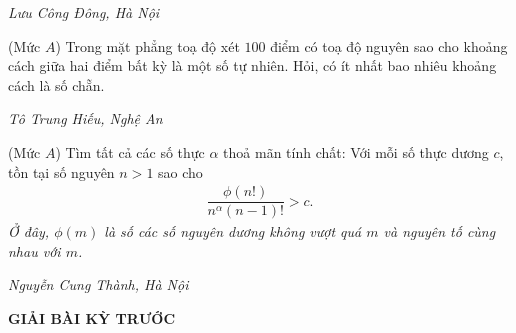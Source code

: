 \begin{multicols}{2}
\begin{flushright}
		\textit{Lưu Công Đông, Hà Nội}
	\end{flushright}
	{}
	(Mức $A$) Trong mặt phẳng toạ độ xét $100$ điểm có toạ độ nguyên sao cho khoảng cách giữa hai điểm bất kỳ là một số tự nhiên. Hỏi, có ít nhất bao nhiêu khoảng cách là số chẵn.
	\begin{flushright}
		\textit{Tô Trung Hiếu, Nghệ An}
	\end{flushright}
	{}
	(Mức $A$) Tìm tất cả các số thực $\alpha$ thoả mãn tính chất: Với mỗi số thực dương $c$, tồn tại số nguyên $n>1$ sao cho 
	\begin{align*}
		\dfrac{\phi\left(n!\right)}{n^\alpha (n-1)!}>c.
	\end{align*}
	{\it Ở đây, $\phi(m)$ là số các số nguyên dương không vượt quá $m$ và  nguyên tố cùng nhau với $m$. }
	\begin{flushright}
		\textit{Nguyễn Cung Thành, Hà Nội}
	\end{flushright}
\end{multicols}
\newpage
\centerline{{\large{\textbf{\color{thachthuctoanhoc}\color{thachthuctoanhoc}\color{thachthuctoanhoc}GIẢI BÀI KỲ TRƯỚC}}}}
\vspace*{-5pt}
